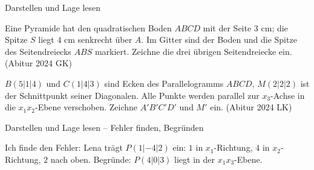 \begin{aufgabe}{Darstellen und Lage lesen}
\begin{teile}
\begin{ksys}[xmin=-7,xmax=7,ymin=-7,ymax=7,xlabel=$x_1$,ylabel=$x_2$]    \end{ksys}
\teil Eine Pyramide hat den quadratischen Boden $ABCD$ mit der Seite $3$ cm; die Spitze $S$ liegt $4$ cm senkrecht über $A$. Im Gitter sind der Boden und die Spitze des Seitendreiecks $ABS$ markiert. Zeichne die drei übrigen Seitendreiecke ein. \hfill (Abitur 2024 GK)

\begin{ksys}[xmin=-5,xmax=9,ymin=-5,ymax=9]      \end{ksys}
\teil $B(5 | 1 | 4)$ und $C(1 | 4 | 3)$ sind Ecken des Parallelogramms $ABCD$, $M(2 | 2 | 2)$ ist der Schnittpunkt seiner Diagonalen. Alle Punkte werden parallel zur $x_3$-Achse in die $x_1x_2$-Ebene verschoben. Zeichne $A'B'C'D'$ und $M'$ ein. \hfill (Abitur 2024 LK)

\begin{ksys3} \end{ksys3}
\end{teile}
\end{aufgabe}

\begin{aufgabe}{Darstellen und Lage lesen – Fehler finden, Begründen}
\begin{teile}
\teil Ich finde den Fehler: Lena trägt $P(1 | -4 | 2)$ ein: $1$ in $x_1$-Richtung, $4$ in $x_2$-Richtung, $2$ nach oben.
\teil Begründe: $P(4 | 0 | 3)$ liegt in der $x_1x_3$-Ebene.
\end{teile}
\end{aufgabe}
